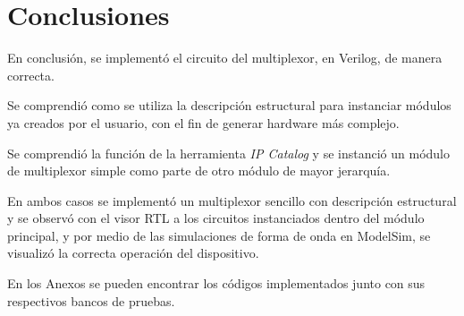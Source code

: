 \section{Conclusiones}
En conclusión, se implementó el circuito del multiplexor, en Verilog, de manera correcta. 

Se comprendió como se utiliza la descripción estructural para instanciar módulos ya creados por el usuario, con el fin de generar hardware más complejo.

Se comprendió la función de la herramienta \textit{IP Catalog} y se instanció un módulo de multiplexor simple como parte de otro módulo de mayor jerarquía.

En ambos casos se implementó un multiplexor sencillo con descripción estructural y se observó con el visor RTL a los circuitos instanciados dentro del módulo principal, y por medio de las simulaciones de forma de onda en ModelSim, se visualizó la correcta operación del dispositivo.

En los Anexos se pueden encontrar los códigos implementados junto con sus respectivos bancos de pruebas. 